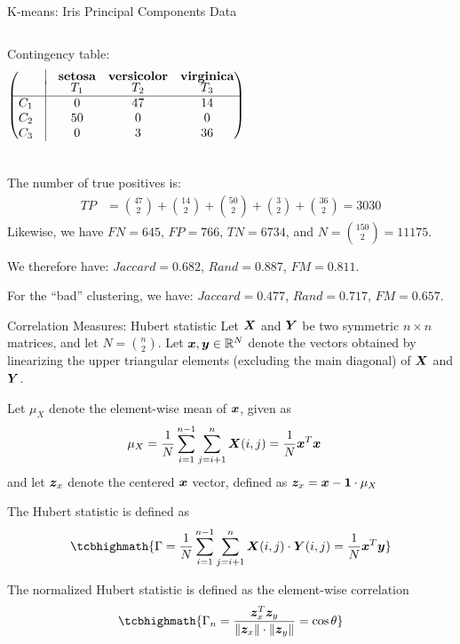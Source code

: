 \begin{frame}[fragile]{K-means: Iris Principal Components Data}
\begin{columns}
Contingency table:
\small
\begin{align*}
  \matr{ & \vline& \textbf{setosa} & \textbf{versicolor} &
  \textbf{virginica}\\[-3pt]
  & \vline & T_1 & T_2 & T_3\\
  \hline
C_1 &\vline& 0 & 47 & 14\\
C_2 &\vline& 50 &  0 &  0\\
C_3 &\vline& 0 &  3 & 36\\
}
\end{align*}
\end{columns}
The number of true
positives is:
\begin{align*}
  \mathit{TP} & = {47 \choose 2} + {14 \choose 2} + {50 \choose 2} + {3 \choose 2}
  + {36 \choose 2} = 3030
\end{align*}
Likewise, we have
$\mathit{FN} = 645$, 
$\mathit{FP} = 766$,
$\mathit{TN} =6734$, and $N = {150 \choose 2} = 11175$.

We therefore have:
$\mathit{Jaccard} = 0.682$, $\mathit{Rand}=0.887$, 
$\mathit{FM} = 0.811$.

For the ``bad'' clustering, we have:
$\mathit{Jaccard} = 0.477$, $\mathit{Rand}=0.717$, 
$\mathit{FM} = 0.657$.

\end{frame}


\begin{frame}{Correlation Measures: Hubert statistic}
\small
  Let ${\boldsymbol X}$ and ${\boldsymbol Y}$ be two symmetric $n \times n$ matrices,
and let $N = {n \choose 2}$.
Let ${\boldsymbol x}, {\boldsymbol y} \in {\mathord{\mathbb R}}^{N}$ denote the
vectors obtained by
linearizing the upper triangular elements (excluding the main diagonal)
of ${\boldsymbol X}$ and ${\boldsymbol Y}$.

\medskip
Let $\mu_X$ denote the element-wise mean of ${\boldsymbol x}$,
given as
\begin{align*}
  \mu_X & = \frac{1}{N}\sum_{i=1}^{n-1}\sum_{j=i+1}^n
  {\boldsymbol X}(i,j) = \frac{1}{N} {\boldsymbol x}^T{\boldsymbol x}
\end{align*}
and let ${\boldsymbol z}_x$ denote the centered ${\boldsymbol x}$ vector, def\/{i}ned as
$ {\boldsymbol z}_x = {\boldsymbol x} - \mathbf{1} \cdot \mu_X$

\medskip
The Hubert statistic is def\/{i}ned as 
\begin{align*}
\tcbhighmath{
  \Gamma =
  \frac{1}{N} \sum_{i=1}^{n-1} \sum_{j=i+1}^n
\bX(i,j)\cdot \bY(i,j) = \frac{1}{N} \bx^T\by
}
\end{align*}

\medskip
The normalized Hubert statistic is def\/{i}ned as the
element-wise correlation
\begin{align*}
\tcbhighmath{
  \Gamma_n =  \frac{\bz_x^T \bz_y}{\norm{\bz_x} \cdot \norm{\bz_y}} =
  \cos \theta
}
\end{align*}
\end{frame}



